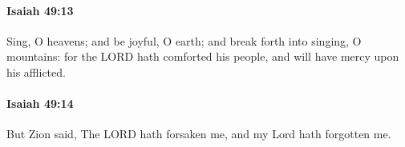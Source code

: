 		\paragraph{Isaiah 49:13} %
			\label{ISAIAH-49-13}

			Sing, O heavens; and be joyful, O earth; and break forth into singing, O mountains: for the LORD hath comforted his people, and will have mercy upon his afflicted.


		\paragraph{Isaiah 49:14} %
			\label{ISAIAH-49-14}

			But Zion said, The LORD hath forsaken me, and my Lord hath forgotten me.


